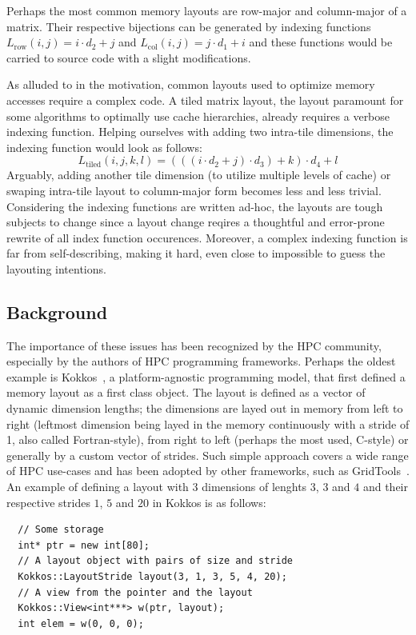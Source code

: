 Perhaps the most common memory layouts are row-major and column-major of a matrix. Their respective bijections can be generated by indexing functions $L_{\text{row}}(i,j) = i \cdot d_2 + j$ and $L_{\text{col}}(i,j) = j \cdot d_1 + i$ and these functions would be carried to source code with a slight modifications. 

As alluded to in the motivation, common layouts used to optimize memory accesses require a complex code. A tiled matrix layout, the layout paramount for some algorithms to optimally use cache hierarchies, already requires a verbose indexing function. Helping ourselves with adding two intra-tile dimensions, the indexing function would look as follows:
$$L_{\text{tiled}}(i,j,k,l) = (((i \cdot d_2 + j) \cdot d_3) + k) \cdot d_4 + l$$
Arguably, adding another tile dimension (to utilize multiple levels of cache) or swaping intra-tile layout to column-major form becomes less and less trivial. Considering the indexing functions are written ad-hoc, the layouts are tough subjects to change since a layout change reqires a thoughtful and error-prone rewrite of all index function occurences. Moreover, a complex indexing function is far from self-describing, making it hard, even close to impossible to guess the layouting intentions.

\subsection{Background}

The importance of these issues has been recognized by the HPC community, especially by the authors of HPC programming frameworks. Perhaps the oldest example is Kokkos~\cite{CARTEREDWARDS20143202}, a platform-agnostic programming model, that first defined a memory layout as a first class object. The layout is defined as a vector of dynamic dimension lengths; the dimensions are layed out in memory from left to right (leftmost dimension being layed in the memory continuously with a stride of 1, also called Fortran-style), from right to left (perhaps the most used, C-style) or generally by a custom vector of strides. Such simple approach covers a wide range of HPC use-cases and has been adopted by other frameworks, such as GridTools~\cite{AFANASYEV2021100707}. An example of defining a layout with $3$ dimensions of lenghts $3$, $3$ and $4$ and their respective strides $1$, $5$ and $20$ in Kokkos is as follows:

\begin{verbatim}
  // Some storage
  int* ptr = new int[80];
  // A layout object with pairs of size and stride
  Kokkos::LayoutStride layout(3, 1, 3, 5, 4, 20);
  // A view from the pointer and the layout
  Kokkos::View<int***> w(ptr, layout);
  int elem = w(0, 0, 0);
\end{verbatim}
  

